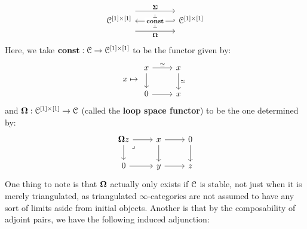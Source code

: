\begin{remark}
                        $$
                            \begin{tikzcd}
                            	{\C^{[1] \x [1]}} && {\C^{[1] \x [1]}}
                            	\arrow[""{name=0, anchor=center, inner sep=0}, "\loopspace"', shift right=5, from=1-1, to=1-3]
                            	\arrow[""{name=1, anchor=center, inner sep=0}, "\suspension", shift left=5, from=1-1, to=1-3]
                            	\arrow[""{name=2, anchor=center, inner sep=0}, "\const"{description}, hook', from=1-3, to=1-1]
                            	\arrow["\dashv"{anchor=center, rotate=-90}, draw=none, from=1, to=2]
                            	\arrow["\dashv"{anchor=center, rotate=-90}, draw=none, from=2, to=0]
                            \end{tikzcd}
                        $$
                    Here, we take $\const: \C \to \C^{[1] \x [1]}$ to be the functor given by:
                        $$
                            x \mapsto 
                            \begin{tikzcd}
                            	x & x \\
                            	0 & x
                            	\arrow[from=1-1, to=2-1]
                            	\arrow[from=2-1, to=2-2]
                            	\arrow["\cong", from=1-1, to=1-2]
                            	\arrow["\cong", from=1-2, to=2-2]
                            \end{tikzcd}
                        $$
                    and $\loopspace: \C^{[1] \x [1]} \to \C$ (called the \textbf{loop space functor}) to be the one determined by:
                        $$
                            \begin{tikzcd}
                            	{\loopspace z} & x & 0 \\
                            	0 & y & z
                            	\arrow[from=1-2, to=1-3]
                            	\arrow[from=1-2, to=2-2]
                            	\arrow[from=1-3, to=2-3]
                            	\arrow[from=2-2, to=2-3]
                            	\arrow[from=1-1, to=2-1]
                            	\arrow[from=2-1, to=2-2]
                            	\arrow[from=1-1, to=1-2]
                            	\arrow["\lrcorner"{anchor=center, pos=0.125}, draw=none, from=1-1, to=2-2]
                            \end{tikzcd}
                        $$
                    One thing to note is that $\mathbf{\Omega}$ actually only exists if $\mathcal{C}$ is stable, not just when it is merely triangulated, as triangulated $\infty$-categories are not assumed to have any sort of limits aside from initial objects. Another is that by the composability of adjoint pairs, we have the following induced adjunction:

\end{remark}
